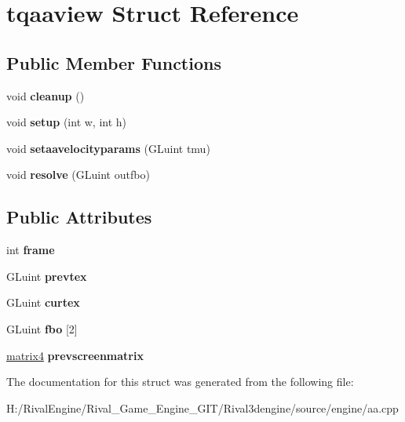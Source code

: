 \hypertarget{structtqaaview}{}\section{tqaaview Struct Reference}
\label{structtqaaview}
\subsection*{Public Member Functions}
\begin{DoxyCompactItemize}
\item 
\mbox{\label{structtqaaview_a2e94a29f33388a66339f8da8bd40b016}} 
void {\bfseries cleanup} ()
\item 
\mbox{\label{structtqaaview_a31604b00a9d58e9f9dcd1e40b2ccce02}} 
void {\bfseries setup} (int w, int h)
\item 
\mbox{\label{structtqaaview_a59d03c4b0e6c0d2d5b25c9954930c5d3}} 
void {\bfseries setaavelocityparams} (G\+Luint tmu)
\item 
\mbox{\label{structtqaaview_a358c44a260296f62c6bbff36b377c900}} 
void {\bfseries resolve} (G\+Luint outfbo)
\end{DoxyCompactItemize}
\subsection*{Public Attributes}
\begin{DoxyCompactItemize}
\item 
\mbox{\label{structtqaaview_a921170c6363bb7772bd813ef83b5ac5f}} 
int {\bfseries frame}
\item 
\mbox{\label{structtqaaview_ad1dcf7297afe37719c56986c64ca708c}} 
G\+Luint {\bfseries prevtex}
\item 
\mbox{\label{structtqaaview_a973c5c588a751f1672cd07154ba730ec}} 
G\+Luint {\bfseries curtex}
\item 
\mbox{\label{structtqaaview_ad3d6a5b29cb3c5f12b0c1c9e63299016}} 
G\+Luint {\bfseries fbo} \mbox{[}2\mbox{]}
\item 
\mbox{\label{structtqaaview_aebd102342ba7714e1a500e2e9a81931e}} 
\hyperlink{structmatrix4}{matrix4} {\bfseries prevscreenmatrix}
\end{DoxyCompactItemize}


The documentation for this struct was generated from the following file\+:\begin{DoxyCompactItemize}
\item 
H\+:/\+Rival\+Engine/\+Rival\+\_\+\+Game\+\_\+\+Engine\+\_\+\+G\+I\+T/\+Rival3dengine/source/engine/aa.\+cpp\end{DoxyCompactItemize}

